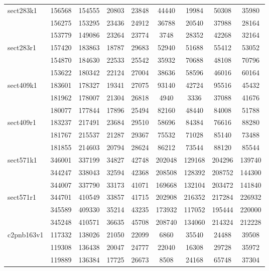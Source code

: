 \documentclass[a4paper]{article}
\begin{document}
\begin{center}
\begin{longtable}{ |l|c|c|c|c|c|c|c|c| }
sect283k1 & 156568 & 154555 & 20803 & 23848 & 44440 & 19984 & 50308 & 35980 \\ 
& 156275 & 153295 & 23436 & 24912 & 36788 & 20540 & 37988 & 28164 \\ 
& 153779 & 149086 & 23264 & 23774 & 3748 & 28352 & 42268 & 32164 \\ \hline

sect283r1 & 157420 & 183863 & 18787 & 29683 & 52940 & 51688 & 55412 & 53052 \\ 
& 154870 & 184630 & 22533 & 25542 & 35932 & 70688 & 48108 & 70796 \\ 
& 153622 & 180342 & 22124 & 27004 & 38636 & 58596 & 46016 & 60164 \\ \hline

sect409k1 & 183601 & 178327 & 19341 & 27075 & 93140 & 42724 & 95516 & 45432 \\
& 181962 & 178007 & 21304 & 26818 & 4940 & 3336 & 37088 & 41676 \\ 
& 180077 & 177844 & 17896 & 25494 & 82160 & 48440 & 84008 & 51788 \\ \hline

sect409r1 & 183237 & 217491 & 23684 & 29510 & 58696 & 84384 & 76616 & 88280 \\ 
& 181767 & 215537 & 21287 & 29367 & 75532 & 71028 & 85140 & 73488 \\
& 181855 & 214603 & 20794 & 28624 & 86212 & 73544 & 88120 & 85544 \\ \hline

sect571k1 & 346001 & 337199 & 34827 & 42748 & 202048 & 129168 & 204296 & 139740 \\
& 344247 & 338043 & 32594 & 42368 & 208508 & 128392 & 208752 & 144300 \\ 
& 344007 & 337790 & 33173 & 41071 & 169668 & 132104 & 203472 & 141840 \\ \hline

sect571r1 & 344701 & 410549 & 33857 & 41715 & 202908 & 216352 & 217284 & 226932 \\
& 345589 & 409330 & 35214 & 43235 & 173932 & 117052 & 195444 & 220000 \\ 
& 345248 & 410571 & 36635 & 45708 & 208740 & 134060 & 214324 & 212228 \\ \hline

c2pnb163v1 & 117332 & 138026 & 21050 & 22099 & 6860 & 35540 & 24488 & 39508 \\
& 119308 & 136438 & 20047 & 24777 & 22040 & 16308 & 29728 & 35972 \\
& 119889 & 136384 & 17725 & 26673 & 8508 & 24168 & 65748 & 37304 \\ \hline


\end{longtable}
\end{center}
\end{document}
